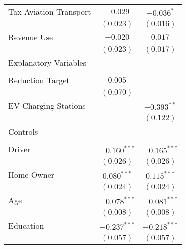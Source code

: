 \begin{center}
\begin{tiny}
\begin{longtable}{l@{} c@{} c@{}}
\quad Tax Aviation Transport                           & $-0.029$         & $-0.036^{*}$     \\
                                                       & $(0.023)$        & $(0.016)$        \\
\quad Revenue Use                                      & $-0.020$         & $0.017$          \\
                                                       & $(0.023)$        & $(0.017)$        \\
Explanatory Variables                                  &                  &                  \\
                                                       &                  &                  \\
\quad Reduction Target                                 & $0.005$          &                  \\
                                                       & $(0.070)$        &                  \\
\quad EV Charging Stations                             &                  & $-0.393^{**}$    \\
                                                       &                  & $(0.122)$        \\
Controls                                               &                  &                  \\
                                                       &                  &                  \\
\quad Driver                                           & $-0.160^{***}$   & $-0.165^{***}$   \\
                                                       & $(0.026)$        & $(0.026)$        \\
\quad Home Owner                                       & $0.080^{***}$    & $0.115^{***}$    \\
                                                       & $(0.024)$        & $(0.024)$        \\
\quad Age                                              & $-0.078^{***}$   & $-0.081^{***}$   \\
                                                       & $(0.008)$        & $(0.008)$        \\
\quad Education                                        & $-0.237^{***}$   & $-0.218^{***}$   \\
                                                       & $(0.057)$        & $(0.057)$        \\

\end{longtable}
\end{tiny}
\end{center}
